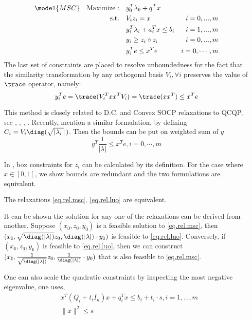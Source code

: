 \documentclass[../main]{subfiles}
\begin{document}
\begin{equation}\label{eq.rel.msc}
  \begin{aligned}
    \model{MSC} \quad \mathrm{Maximize: }\quad & y_0 ^T\lambda_0 + q^Tx                              \\
    \mathrm{s.t.} \quad                        & V_i z_i = x                        & i=0,...,m      \\
                                               & y_i ^T\lambda_i  + a_i^Tx  \le b_i & i=1,...,m      \\
                                               & y_i \ge z_i \circ z_i              & i=0,...,m      \\
                                               & y_i^Te \le x^Te                    & i=0, \cdots, m
  \end{aligned}
\end{equation}
The last set of constraints are placed to resolve unboundedness for the fact that the similarity transformation by any orthogonal basis \(V_i, \forall i\) preserves the value of \(\trace\) operator, namely:
\begin{equation}
  y_i^Te = \trace( V_i^Txx^T V_i) = \trace (xx^T) \le x^Te
\end{equation}

This method is closely related to D.C. and Convex SOCP relaxations to QCQP, see \cite{zheng_convex_2011}, \cite{zheng_nonconvex_2011}, \cite{jiang_simultaneous_2016}, \cite{ye_new_2003}. Recently, \cite{luo_new_2019} mention a similar formulation, by defining \(C_i = V_i\diag(\sqrt{|\lambda_i|}|)\). Then the bounds can be put on weighted sum of \(y\)
\begin{equation} \label{eq.rel.luo} y^T\frac{1}{|\lambda|}  \le x^Te, i=0, \cdots, m
\end{equation}


In \cite{luo_new_2019}, box constraints for \(z_i\) can be calculated by its definition. For the case where \(x\in [0, 1]\), we show bounds are redundant and the two formulations are equivalent.

\begin{proposition}
  The relaxations \eqref{eq.rel.msc}, \eqref{eq.rel.luo} are equivalent.
\end{proposition}
It can be shown the solution for any one of the relaxations can be derived from another.  Suppose $(x_0, z_0, y_0)$ is a feasible solution to \eqref{eq.rel.msc}, then $(x_0, \sqrt{\diag(|\lambda|)} z_0, \diag(|\lambda|) \cdot y_0)$ is feasible to \eqref{eq.rel.luo}. Conversely, if $(x_0, z_0, y_0)$ is feasible to \eqref{eq.rel.luo}, then we can construct $(x_0, \frac{1}{\sqrt{\diag(|\lambda|)}} z_0, \frac{1}{\diag(|\lambda|)}\cdot y_0)$ that is also feasible to \eqref{eq.rel.msc}.

One can also scale the quadratic constraints by inspecting the most negative eigenvalue, one uses,
\begin{align*}
   & x^T(Q_i+t_i I_n) x+q_i^T x \leqslant b_i+ t_i \cdot s,i= 1,\dots, m \\
   & \|x\|^2 \le s
\end{align*}
\end{document}
